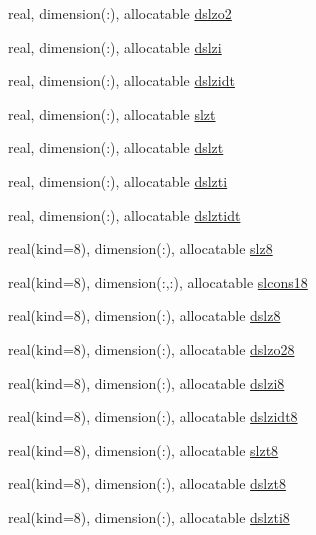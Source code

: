 \begin{DoxyCompactItemize}
\item 
real, dimension(\+:), allocatable \hyperlink{namespacesoil__coms_af12370b1017ccb30ff0d20906aa4a45d}{dslzo2}
\item 
real, dimension(\+:), allocatable \hyperlink{namespacesoil__coms_af2b544726d6dd9705d4b8c7c5714d92d}{dslzi}
\item 
real, dimension(\+:), allocatable \hyperlink{namespacesoil__coms_a4b61cf24c813f2846a39570dd4ea05a8}{dslzidt}
\item 
real, dimension(\+:), allocatable \hyperlink{namespacesoil__coms_a2a9957b4fa1ef14eea11a18d85ba6e3d}{slzt}
\item 
real, dimension(\+:), allocatable \hyperlink{namespacesoil__coms_a94ad39e6d9d5ff44b58fc26edd54e28d}{dslzt}
\item 
real, dimension(\+:), allocatable \hyperlink{namespacesoil__coms_af5edf2523e90d608f848782aad517da2}{dslzti}
\item 
real, dimension(\+:), allocatable \hyperlink{namespacesoil__coms_a40f71a36860d25e091b99e5ecead9cbe}{dslztidt}
\item 
real(kind=8), dimension(\+:), allocatable \hyperlink{namespacesoil__coms_ad701b5cd7609d6ffbd1b800df6a04bb5}{slz8}
\item 
real(kind=8), dimension(\+:,\+:), allocatable \hyperlink{namespacesoil__coms_ade6e1d0e2d355c5f3a340352163128d9}{slcons18}
\item 
real(kind=8), dimension(\+:), allocatable \hyperlink{namespacesoil__coms_ac6e349c53a31e55f1966a12b2b609523}{dslz8}
\item 
real(kind=8), dimension(\+:), allocatable \hyperlink{namespacesoil__coms_af39809572006ef58a973b409d4dc013e}{dslzo28}
\item 
real(kind=8), dimension(\+:), allocatable \hyperlink{namespacesoil__coms_ad8684255b655da1970dfa6f829724dce}{dslzi8}
\item 
real(kind=8), dimension(\+:), allocatable \hyperlink{namespacesoil__coms_ab5f252a1d4e385eaa66e06a4e7de7bc9}{dslzidt8}
\item 
real(kind=8), dimension(\+:), allocatable \hyperlink{namespacesoil__coms_a93fd7b06c92beb4d98c9c197b1d7b445}{slzt8}
\item 
real(kind=8), dimension(\+:), allocatable \hyperlink{namespacesoil__coms_a7b1c34644ae733852ef371e7764e23d1}{dslzt8}
\item 
real(kind=8), dimension(\+:), allocatable \hyperlink{namespacesoil__coms_ad8c0bc69f2eebddc89763e0789953239}{dslzti8}
\item 

\end{DoxyCompactItemize}
